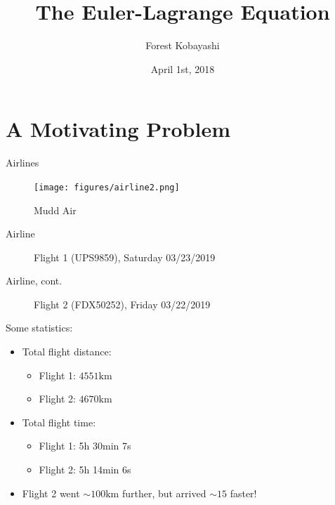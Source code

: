\documentclass{fkpresentation}
\title{\textmd{The Euler-Lagrange Equation}}
\author{Forest Kobayashi}
\institute{Harvey Mudd College}
\date{April 1st, 2018}
\begin{document}
\frame{\titlepage}
\section{A Motivating Problem}

\begin{frame}{Airlines}
  \begin{figure}[h]
    \centering
    \texttt{[image: figures/airline2.png]}
    \caption{Mudd Air}
  \end{figure}
\end{frame}

\begin{frame}{Airline}
  \begin{figure}[h]
    \centering
    \caption{Flight 1 (UPS9859), Saturday 03/23/2019}
  \end{figure}
\end{frame}

\begin{frame}{Airline, cont.}
  \begin{figure}[h]
    \centering
    \caption{Flight 2 (FDX50252), Friday 03/22/2019}
  \end{figure}
\end{frame}

\begin{frame}{Some statistics:}
  \begin{itemize}
    \item Total flight distance:
      \begin{itemize}
        \item Flight 1: $4551\si{\kilo\meter}$
        \item Flight 2: $4670\si{\kilo\meter}$
      \end{itemize}
    \item Total flight time:
      \begin{itemize}
        \item Flight 1: 5h 30min 7s
        \item Flight 2: 5h 14min 6s
      \end{itemize}
    \item Flight 2 went $\sim 100 \si{\kilo\meter}$ further, but arrived $\sim
      15$ faster!
  \end{itemize}
\end{frame}
\end{document}
